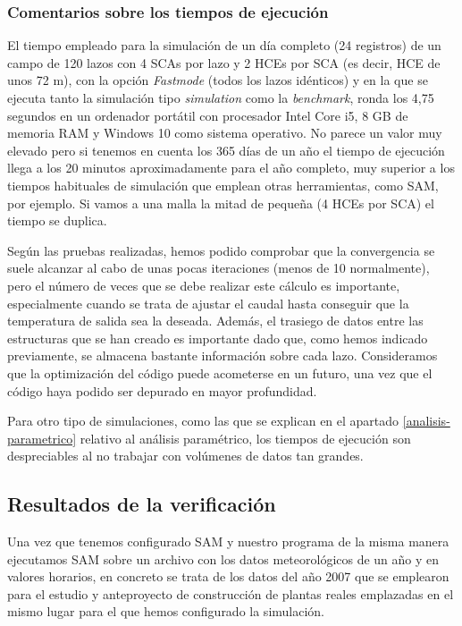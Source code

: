 \subsubsection{Comentarios sobre los tiempos de ejecución}

El tiempo empleado para la simulación de un día completo (24 registros) de un campo de 120 lazos con 4 SCAs por lazo y 2 HCEs por SCA (es decir, HCE de unos 72 m), con la opción \emph{Fastmode} (todos los lazos idénticos) y en la que se ejecuta tanto la simulación tipo \emph{simulation} como la \emph{benchmark}, ronda los 4,75 segundos en un ordenador portátil con procesador Intel Core i5, 8 GB de memoria RAM y Windows 10 como sistema operativo. No parece un valor muy elevado pero si tenemos en cuenta los 365 días de un año el tiempo de ejecución llega a los 20 minutos aproximadamente para el año completo, muy superior a los tiempos habituales de simulación que emplean otras herramientas, como SAM, por ejemplo. Si vamos a una malla la mitad de pequeña (4 HCEs por SCA) el tiempo se duplica.  

Según las pruebas realizadas, hemos podido comprobar que la convergencia se suele alcanzar al cabo de unas pocas iteraciones (menos de 10 normalmente), pero el número de veces que se debe realizar este cálculo es importante, especialmente cuando se trata de ajustar el caudal hasta conseguir que la temperatura de salida sea la deseada. Además, el trasiego de datos entre las estructuras que se han creado es importante dado que, como  hemos indicado previamente, se almacena bastante información sobre cada lazo. Consideramos que la optimización del código puede acometerse en un futuro, una vez que el código haya podido ser depurado en mayor profundidad.

Para otro tipo de simulaciones, como las que se explican en el apartado \ref{analisis-parametrico} relativo al análisis paramétrico, los tiempos de ejecución son despreciables al no trabajar con volúmenes de datos tan grandes.


\subsection{Resultados de la verificación}
\label{resultados-validacion}
 
Una vez que tenemos configurado SAM y nuestro programa de la misma manera ejecutamos SAM sobre un archivo con los datos meteorológicos de un año y en valores horarios, en concreto se trata de los datos del año 2007 que se emplearon para el estudio y anteproyecto de construcción de plantas reales emplazadas en el mismo lugar para el que hemos configurado la simulación.  

